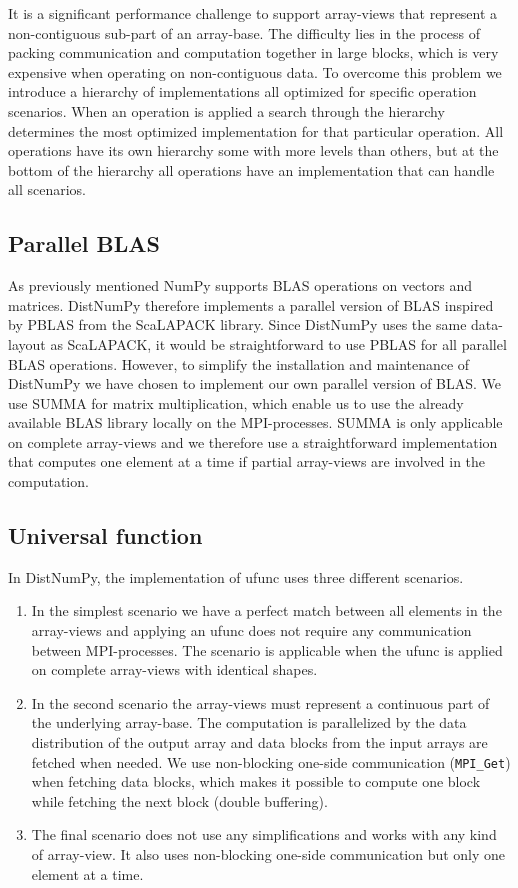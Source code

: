 \documentclass{sigplanconf}
\begin{document}
It is a significant performance challenge to support array-views that represent a non-contiguous sub-part of an array-base. The difficulty lies in the process of packing communication and computation together in large blocks, which is very expensive when operating on non-contiguous data. To overcome this problem we introduce a hierarchy of implementations all optimized for specific operation scenarios. When an operation is applied a search through the hierarchy determines the most optimized implementation for that particular operation. All operations have its own hierarchy some with more levels than others, but at the bottom of the hierarchy all operations have an implementation that can handle all scenarios.


\subsection{Parallel BLAS}
As previously mentioned NumPy supports BLAS operations on vectors and matrices. DistNumPy therefore implements a parallel version of BLAS inspired by PBLAS from the ScaLAPACK library. Since DistNumPy uses the same data-layout as ScaLAPACK, it would be straightforward to use PBLAS for all parallel BLAS operations. However, to simplify the installation and maintenance of DistNumPy we have chosen to implement our own parallel version of BLAS. We use SUMMA\cite{SUMMA_GeijnW97} for matrix multiplication, which enable us to use the already available BLAS library locally on the MPI-processes. SUMMA is only applicable on complete array-views and we therefore use a straightforward implementation that computes one element at a time if partial array-views are involved in the computation. 

\subsection{Universal function}
In DistNumPy, the implementation of ufunc uses three different scenarios.
\begin{enumerate}
\item In the simplest scenario we have a perfect match between all elements in the array-views and applying an ufunc does not require any communication between MPI-processes. The scenario is applicable when the ufunc is applied on complete array-views with identical shapes.
\item In the second scenario the array-views must represent a continuous part of the underlying array-base. The computation is parallelized by the data distribution of the output array and data blocks from the input arrays are fetched when needed. We use non-blocking one-side communication (\texttt{MPI\_Get}) when fetching data blocks, which makes it possible to compute one block while fetching the next block (double buffering).
\item The final scenario does not use any simplifications and works with any kind of array-view. It also uses non-blocking one-side communication but only one element at a time.
\end{enumerate}
\end{document}
